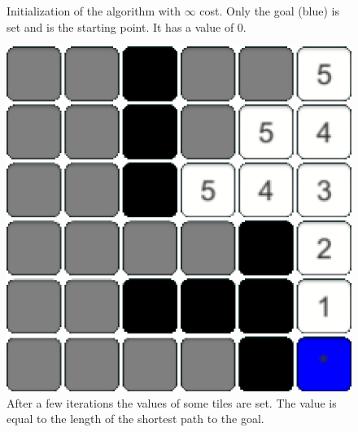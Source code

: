 \documentclass[conference]{IEEEtran}
\begin{document}
\begin{figure}[h]
\begin{minipage}[t]{0.3\linewidth}
\caption{Initialization of the algorithm with $\infty$ cost. Only the goal (blue) is set and is the starting point. It has a value of 0.}
\end{minipage}
\hfill
\begin{minipage}[t]{0.3\linewidth}
\centering
\includegraphics[width=1\textwidth]{images/intro/few.png}
\caption{After a few iterations the values of some tiles are set. The value is equal to the length of the shortest path to the goal.}
\end{minipage}



\end{figure}
\end{document}

